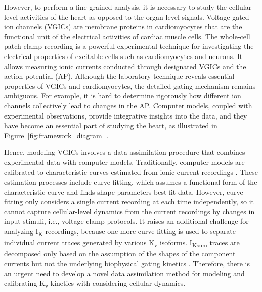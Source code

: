 \documentclass[11pt]{article}
\begin{document}
However, to perform a fine-grained analysis, it is necessary to study the cellular-level activities of the heart as opposed to the organ-level signals. Voltage-gated ion channels (VGICs) are membrane proteins in cardiomyocytes that are the functional unit of the electrical activities of cardiac muscle cells. The whole-cell patch clamp recording is a powerful experimental technique for investigating the electrical properties of excitable cells such as cardiomyocytes and neurons. It allows measuring ionic currents conducted through designated VGICs and the action potential (AP). Although the laboratory technique reveals essential properties of VGICs and cardiomyocytes, the detailed gating mechanism remains ambiguous. For example, it is hard to determine rigorously how different ion channels collectively lead to changes in the AP. Computer models, coupled with experimental observations, provide integrative insights into the data, and they have become an essential part of studying the heart, as illustrated in Figure~\ref{fig:framework_diagram} \citep{winslow2011integrative}. 

Hence, modeling VGICs involves a data assimilation procedure that combines experimental data with computer models. Traditionally, computer models are calibrated to characteristic curves estimated from ionic-current recordings \citep{colman2018description}. These estimation processes include curve fitting, which assumes a functional form of the characteristic curve and finds shape parameters best fit data. However, curve fitting only considers a single current recording at each time independently, so it cannot capture cellular-level dynamics from the current recordings by changes in input stimuli, i.e., voltage-clamp protocols. It raises an additional challenge for analyzing I\textsubscript{K} recordings, because one-more curve fitting is used to separate individual current traces generated by various K\textsubscript{v} isoforms. I\textsubscript{Ksum} traces are decomposed only based on the assumption of the shapes of the component currents but not the underlying biophysical gating kinetics \citep{kim2022simulation}. Therefore, there is an urgent need to develop a novel data assimilation method for modeling and calibrating K\textsubscript{v} kinetics with considering cellular dynamics.
\end{document}
